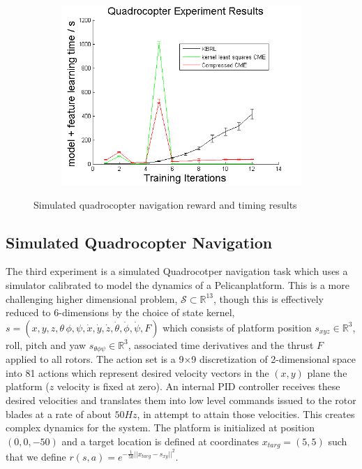 \documentclass[letterpaper]{article}
\newcommand{\cS}{{\mathcal S}}
\newcommand{\R}{{\mathbb R}}
\begin{document}
\begin{figure}[htb]
\begin{subfigure}[b]{0.3\textwidth}
\includegraphics[width=\textwidth]{Quadmodelfeature.png}
\end{subfigure}
\caption{Simulated quadrocopter navigation reward and timing results}
  \label{Quadfigs}
\end{figure}

\subsection{Simulated Quadrocopter Navigation}

The third experiment is a simulated Quadrocotper navigation task which uses a simulator \citep{denardi2013rn} calibrated to model the dynamics of a Pelican\texttrademark  platform. This is a more challenging higher dimensional problem, $\cS\subset\R^{13}$, though this is effectively reduced to 6-dimensions by the choice of state kernel, $s=(x,y,z,\theta\,\phi,\psi,\dot{x},\dot{y},\dot{z},\dot{\theta},\dot{\phi},\dot{\psi},F)$ which consists of platform position $s_{xyz}\in\R^3$, roll, pitch and yaw $s_{\theta\phi\psi}\in\R^3$, associated time derivatives and the thrust $F$ applied to all rotors. The action set is a 9$\times$9 discretization of 2-dimensional space into 81 actions which represent desired velocity vectors in the $(x,y)$ plane the platform ($z$ velocity is fixed at zero). An internal PID controller receives these desired velocities and translates them into low level commands issued to the rotor blades at a rate of about $50Hz$, in attempt to attain those velocities. This creates complex dynamics for the system. The platform is initialized at position $(0,0,-50)$ and a target location is defined at coordinates $x_{targ} = (5,5)$ such that we define $r(s,a)=e^{-\frac{1}{50}||x_{targ}-s_{xy}||^{2}}$.
\end{document}
